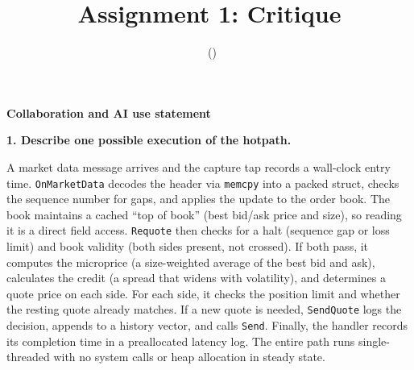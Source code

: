 \documentclass[11pt]{article}
\title{Assignment 1: Critique}
\author{\studentname\ (\netid)}
\date{}
\newcommand{\prompt}[1]{\par\medskip\noindent\textbf{#1}\par\smallskip\noindent\ignorespaces}
\begin{document}
\maketitle

\begin{center}
  \textbf{Collaboration and AI use statement}
\end{center}
\noindent{}

\clearpage

\prompt{1. Describe one possible execution of the hotpath.}

A market data message arrives and the capture tap records a wall-clock entry time. \texttt{OnMarketData} decodes the header via \texttt{memcpy} into a packed struct, checks the sequence number for gaps, and applies the update to the order book. The book maintains a cached ``top of book'' (best bid/ask price and size), so reading it is a direct field access. \texttt{Requote} then checks for a halt (sequence gap or loss limit) and book validity (both sides present, not crossed). If both pass, it computes the microprice (a size-weighted average of the best bid and ask), calculates the credit (a spread that widens with volatility), and determines a quote price on each side. For each side, it checks the position limit and whether the resting quote already matches. If a new quote is needed, \texttt{SendQuote} logs the decision, appends to a history vector, and calls \texttt{Send}. Finally, the handler records its completion time in a preallocated latency log. The entire path runs single-threaded with no system calls or heap allocation in steady state.
\end{document}
